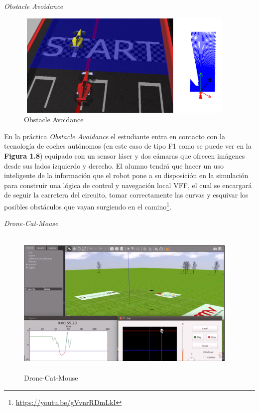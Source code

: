\vspace{1cm}
\hspace{0.35\linewidth}
\textit{Obstacle Avoidance}

\begin{figure}[H]
  \begin{center}
    \includegraphics[width=0.95\textwidth, height=5cm]{figures/obstacle_avoidance.png}
		\caption{Obstacle Avoidance}
		\label{fig.obstacleavoidance}
		\end{center}
\end{figure}

En la práctica \textit{Obstacle Avoidance} el estudiante entra en contacto con la tecnología de coches autónomos (en este caso de tipo F1 como se puede ver en la \textbf{Figura 1.8}) equipado con un sensor láser y dos cámaras que ofrecen imágenes desde sus lados izquierdo y derecho. El alumno tendrá que hacer un uso inteligente de la información que el robot pone a su disposición en la simulación para construir una lógica de control y navegación local VFF, el cual se encargará de seguir la carretera del circuito, tomar correctamente las curvas y esquivar los posibles obstáculos que vayan surgiendo en el camino\footnote{\url{https://youtu.be/gVvnrRDmLkI}}.

\hspace{0.35\linewidth}
\textit{Drone-Cat-Mouse}

\begin{figure}[H]
  \begin{center}
    \includegraphics[width=0.95\textwidth, height=7.2cm]{figures/dronecatmouse.png}
		\caption{Drone-Cat-Mouse}
		\label{fig.dronecatmouse}
		\end{center}
\end{figure}

